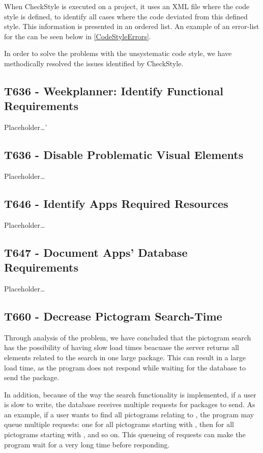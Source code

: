 When CheckStyle is executed on a project, it uses an XML file where the code
style is defined, to identify all cases where the code deviated from this
defined style. This information is presented in an ordered list. An example of
an error-list for the  can be seen below in
\autoref{CodeStyleErrors}.


In order to solve the problems with the unsystematic code style, we have
methodically resolved the issues identified by CheckStyle.

\subsection{T636 - Weekplanner: Identify Functional Requirements}
Placeholder\ldots'


\subsection{T636 - Disable Problematic Visual Elements}
Placeholder\ldots

\subsection{T646 - Identify Apps Required Resources}
Placeholder\ldots

\subsection{T647 - Document Apps' Database Requirements}
Placeholder\ldots

\subsection{T660 - Decrease Pictogram Search-Time}
Through analysis of the problem, we have concluded that the pictogram search has
the possibility of having slow load times beacuase the server returns all
elements related to the search in one large package. This can result in a large
load time, as the program does not respond while waiting for the database to
send the package. \nl

In addition, because of the way the search functionality is
implemented, if a user is slow to write, the database receives multiple requests
for packages to send. As an example, if a user wants to find all pictograms
relating to , the program may queue multiple requests: one for
all pictograms starting with , then for all pictograms starting with
, and so on. This queueing of requests can make the program wait for a
very long time before responding.\nl

